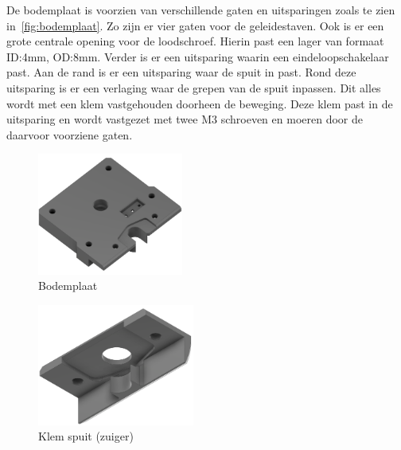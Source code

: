 De bodemplaat is voorzien van verschillende gaten en uitsparingen zoals te zien in\ \autoref{fig:bodemplaat}. Zo zijn er vier gaten voor de geleidestaven. Ook is er een grote centrale opening voor de loodschroef. Hierin past een lager van formaat ID:4mm, OD:8mm. Verder is er een uitsparing waarin een eindeloopschakelaar past. Aan de rand is er een uitsparing waar de spuit in past. Rond deze uitsparing is er een verlaging waar de grepen van de spuit inpassen. Dit alles wordt met een klem vastgehouden doorheen de beweging. Deze klem past in de uitsparing en wordt vastgezet met twee M3 schroeven en moeren door de daarvoor voorziene gaten.
\\[12pt]\begin{minipage}[t]{0.49\textwidth}
    \vspace{0pt}
    \begin{figure}[H]
        \centering
        \includegraphics[height=4cm]{figures/Foundation_1_w.png}
        \caption{Bodemplaat}\label{fig:bodemplaat}
    \end{figure}
\end{minipage}
\begin{minipage}[t]{0.49\textwidth}
    \vspace{0pt}
    \begin{figure}[H]
        \centering
        \includegraphics[height=4cm]{figures/Foundation_clamp_w.png}
        \caption{Klem spuit (zuiger)}\label{fig:clamp}
    \end{figure}
\end{minipage}\\


